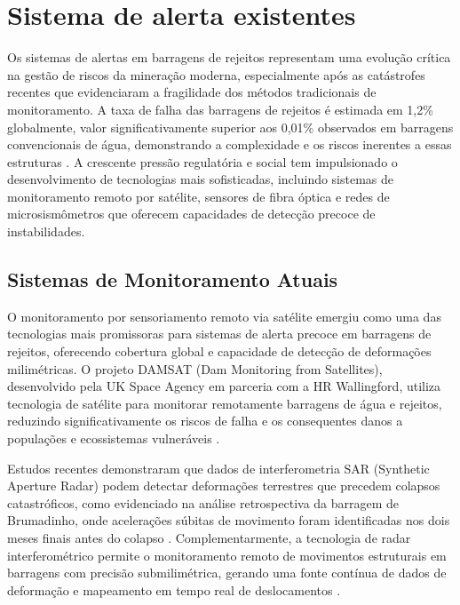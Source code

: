 \section{Sistema de alerta existentes}
\label{sec:sistema_alerta}

Os sistemas de alertas em barragens de rejeitos representam uma evolução crítica na gestão de riscos da mineração moderna, especialmente após as catástrofes recentes que evidenciaram a fragilidade dos métodos tradicionais de monitoramento. A taxa de falha das barragens de rejeitos é estimada em 1,2\% globalmente, valor significativamente superior aos 0,01\% observados em barragens convencionais de água, demonstrando a complexidade e os riscos inerentes a essas estruturas \cite{stocks2019tailings}. A crescente pressão regulatória e social tem impulsionado o desenvolvimento de tecnologias mais sofisticadas, incluindo sistemas de monitoramento remoto por satélite, sensores de fibra óptica e redes de microsismômetros que oferecem capacidades de detecção precoce de instabilidades.

\subsection{Sistemas de Monitoramento Atuais}

O monitoramento por sensoriamento remoto via satélite emergiu como uma das tecnologias mais promissoras para sistemas de alerta precoce em barragens de rejeitos, oferecendo cobertura global e capacidade de detecção de deformações milimétricas. O projeto DAMSAT (Dam Monitoring from Satellites), desenvolvido pela UK Space Agency em parceria com a HR Wallingford, utiliza tecnologia de satélite para monitorar remotamente barragens de água e rejeitos, reduzindo significativamente os riscos de falha e os consequentes danos a populações e ecossistemas vulneráveis \cite{hrwallingford2021damsat}.

Estudos recentes demonstraram que dados de interferometria SAR (Synthetic Aperture Radar) podem detectar deformações terrestres que precedem colapsos catastróficos, como evidenciado na análise retrospectiva da barragem de Brumadinho, onde acelerações súbitas de movimento foram identificadas nos dois meses finais antes do colapso \cite{naturecomm2020advanced}. Complementarmente, a tecnologia de radar interferométrico permite o monitoramento remoto de movimentos estruturais em barragens com precisão submilimétrica, gerando uma fonte contínua de dados de deformação e mapeamento em tempo real de deslocamentos \cite{hexagon2024monitoramento}.


